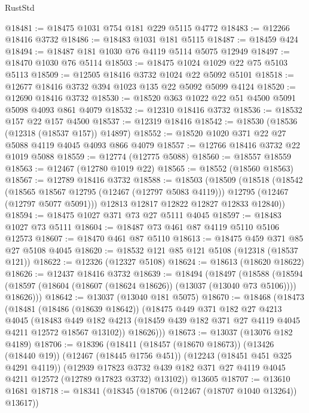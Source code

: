 \begin{lexlean}{RustStd}
\begin{coremodule}
@18481 := @18475 @1031 @754 @181 @229 @5115 @4772
@18483 := @12266 @18416 @3732
@18486 := @18483 @1031 @181 @5115
@18487 := @18459 @424
@18494 := @18487 @181 @1030 @76 @4119 @5114 @5075 @12949
@18497 := @18470 @1030 @76 @5114
@18503 := @18475 @1024 @1029 @22 @75 @5103 @5113
@18509 := @12505 @18416 @3732 @1024 @22 @5092 @5101
@18518 := @12677 @18416 @3732 @394 @1023 @135 @22 @5092 @5099 @4124
@18520 := @12690 @18416 @3732
@18530 := @18520 @363 @1022 @22 @51 @4500 @5091 @5098 @4093 @861 @4079
@18532 := @12310 @18416 @3732
@18536 := @18532 @157 @22 @157 @4500
@18537 := @12319 @18416
@18542 := @18530 (@18536 (@12318 (@18537 @157)) @14897)
@18552 := @18520 @1020 @371 @22 @27 @5088 @4119 @4045 @4093 @866 @4079
@18557 := @12766 @18416 @3732 @22 @1019 @5088
@18559 := @12774 (@12775 @5088)
@18560 := @18557 @18559
@18563 := @12467 (@12780 @1019 @22)
@18565 := @18552 (@18560 @18563)
@18567 := @12789 @18416 @3732
@18588 := @18503
    (@18509
      (@18518
        (@18542
          (@18565 @18567 @12795 (@12467 (@12797 @5083 @4119)))
          @12795
          (@12467 (@12797 @5077 @5091)))
        @12813
        @12817
        @12822
        @12827
        @12833
        @12840))
@18594 := @18475 @1027 @371 @73 @27 @5111 @4045
@18597 := @18483 @1027 @73 @5111
@18604 := @18487 @73 @461 @87 @4119 @5110 @5106 @12573
@18607 := @18470 @461 @87 @5110
@18613 := @18475 @459 @371 @85 @27 @5108 @4045
@18620 := @18532 @121 @85 @121 @5108 (@12318 (@18537 @121))
@18622 := @12326 (@12327 @5108)
@18624 := @18613 (@18620 @18622)
@18626 := @12437 @18416 @3732
@18639 := @18494
    (@18497
      (@18588
        (@18594 (@18597 (@18604 (@18607 (@18624 @18626)) (@13037 (@13040 @73 @5106)))) @18626)))
@18642 := @13037 (@13040 @181 @5075)
@18670 := @18468
    (@18473
      (@18481
        (@18486 (@18639 @18642))
        (@18475
          @449
          @371
          @182
          @27
          @4213
          @4045
          (@18483
            @449
            @182
            @4213
            (@18459 @439 @182 @371 @27 @4119 @4045 @4211 @12572 @18567 @13102))
          @18626)))
@18673 := @13037 (@13076 @182 @4189)
@18706 := @18396
    (@18411
      (@18457 (@18670 @18673))
      (@13426 (@18440 @19))
      (@12467 (@18445 @1756 @451))
      (@12243 (@18451 @451 @325 @4291 @4119))
      (@12939
        @17823
        @3732
        @439
        @182
        @371
        @27
        @4119
        @4045
        @4211
        @12572
        (@12789 @17823 @3732)
        @13102))
    @13605
@18707 := @13610 @1681
@18718 := @18341
    (@18345 (@18706 (@12467 (@18707 @1040 @13264)) @13617))

\end{coremodule}
\end{lexlean}
